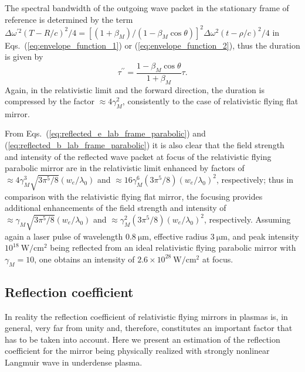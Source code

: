 \documentclass[10pt, a4paper, twoside, openright]{report}
\begin{document}
The spectral bandwidth of the outgoing wave packet in the stationary frame of reference is determined by the term $ \Delta \omega^{\prime 2} \left( T - R / c \right)^2 / 4 = \left[ \left( 1 + \beta_M \right) / \left( 1 - \beta_M \cos \theta \right) \right]^2 \Delta \omega^2 \left( t - \rho / c \right)^2 / 4 $ in Eqs.~(\ref{eq:envelope_function_1}) or (\ref{eq:envelope_function_2}), thus the duration is given by
\begin{equation}\label{eq:compression_factor_parabolic}
	\tau^{\prime \prime} = \frac{1 - \beta_M \cos \theta}{1 + \beta_M} \tau.
\end{equation}
Again, in the relativistic limit and the forward direction, the duration is compressed by the factor $ \approx 4 \gamma_M^2 $, consistently to the case of relativistic flying flat mirror.

From Eqs.~(\ref{eq:reflected_e_lab_frame_parabolic}) and (\ref{eq:reflected_b_lab_frame_parabolic}) it is also clear that the field strength and intensity of the reflected wave packet at focus of the relativistic flying parabolic mirror are in the relativistic limit enhanced by factors of $ \approx 4 \gamma_M^3 \sqrt{3 \pi^5 / 8} \left( w_e / \lambda_0 \right) $ and $ \approx 16 \gamma_M^6 \left( 3 \pi^5 / 8 \right) \left( w_e / \lambda_0 \right)^2 $, respectively; thus in comparison with the relativistic flying flat mirror, the focusing provides additional enhancements of the field strength and intensity of $ \approx \gamma_M \sqrt{3 \pi^5 / 8} \left( w_e / \lambda_0 \right) $ and $ \approx \gamma_M^2 \left( 3 \pi^5 / 8 \right) \left( w_e / \lambda_0 \right)^2 $, respectively. Assuming again a laser pulse of wavelength $ 0.8 \ \mathrm{\mu m} $, effective radius $ 3 \ \mathrm{\mu m} $, and peak intensity $ 10^{18} \ \mathrm{W / cm^2} $ being reflected from an ideal relativistic flying parabolic mirror with $ \gamma_M = 10 $, one obtains an intensity of $ 2.6 \times 10^{28} \ \mathrm{W / cm^2} $ at focus.

\subsection{Reflection coefficient}


In reality the reflection coefficient of relativistic flying mirrors in plasmas is, in general, very far from unity and, therefore, constitutes an important factor that has to be taken into account. Here we present an estimation of the reflection coefficient for the mirror being physically realized with strongly nonlinear Langmuir wave in underdense plasma.
\end{document}
